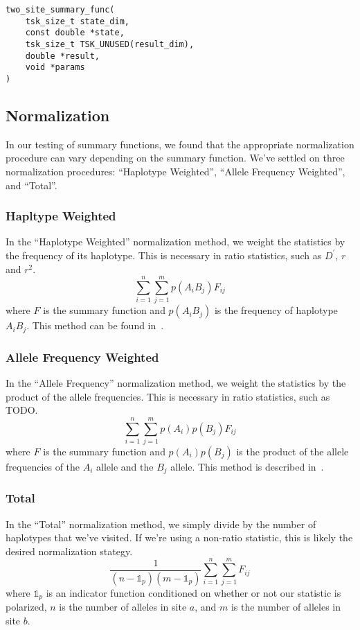 \documentclass[12pt]{article}
\begin{document}
\begin{verbatim}
two_site_summary_func(
	tsk_size_t state_dim,
	const double *state,
	tsk_size_t TSK_UNUSED(result_dim),
	double *result,
	void *params
)
\end{verbatim}

\subsection{Normalization} \label{section:normalization}
In our testing of summary functions, we found that the appropriate normalization
procedure can vary depending on the summary function. We've settled on three
normalization procedures: ``Haplotype Weighted'', ``Allele Frequency Weighted'',
and ``Total''.

\subsubsection{Hapltype Weighted}
In the ``Haplotype Weighted'' normalization method, we weight the statistics by
the frequency of its haplotype. This is necessary in ratio statistics, such as
$D^{\prime}$, $r$ and $r^{2}$.
\[
  \sum_{i=1}^{n}\sum_{j=1}^{m}p(A_{i}B_{j})F_{ij}
\]
where $F$ is the summary function and $p(A_{i}B_{j})$ is the frequency of
haplotype $A_{i}B_{j}$. This method can be found
in~\cite{zhao2007evaluation}.

\subsubsection{Allele Frequency Weighted}
In the ``Allele Frequency'' normalization method, we weight the statistics by
the product of the allele frequencies. This is necessary in ratio statistics,
such as TODO.
\[
  \sum_{i=1}^{n}\sum_{j=1}^{m}p(A_{i})p(B_{j})F_{ij}
\]
where $F$ is the summary function and $p(A_{i})p(B_{j})$ is the product of the
allele frequencies of the $A_{i}$ allele and the $B_{j}$ allele. This method is
described in~\cite{hedrick1987gametic}.

\subsubsection{Total}
In the ``Total'' normalization method, we simply divide by the number of
haplotypes that we've visited. If we're using a non-ratio statistic, this is
likely the desired normalization stategy.
\[
  \frac{1}{(n-\mathbb{1}_{p}) (m-\mathbb{1}_{p})}\sum_{i=1}^{n}\sum_{j=1}^{m}F_{ij}
\]
where $\mathbb{1}_{p}$ is an indicator function conditioned on whether or not
our statistic is polarized, $n$ is the number of alleles in site $a$, and $m$ is
the number of alleles in site $b$.
\end{document}
